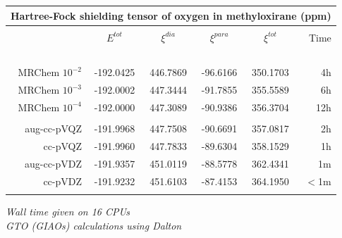 \begin{frame}
\begin{table}
\centering
\begin{tabular}{r|c|cccr}
\multicolumn{6}{c}{\textbf{Hartree-Fock shielding tensor of oxygen in methyloxirane (ppm)}}\\
\hline
\hline
                     &               &               &               &               &               \\
                     & $E^{tot}$     &$\xi^{dia}$    & $\xi^{para}$  &$\xi^{tot}$    &Time           \\
       	             &\hspace{15mm}\ &\hspace{15mm}\ &\hspace{15mm}\ &\hspace{15mm}\ &\hspace{05mm}\ \\
    MRChem $10^{-2}$ & -192.0425     &  446.7869     &  -96.6166     &  350.1703     &    4h         \\
    MRChem $10^{-3}$ & -192.0002     &  447.3444     &  -91.7855     &  355.5589     &    6h         \\
    MRChem $10^{-4}$ & -192.0000     &  447.3089     &  -90.9386     &  356.3704     &   12h         \\
	             &               &               &               &               &               \\
    aug-cc-pVQZ      & -191.9968     &  447.7508     &  -90.6691     &  357.0817     &    2h         \\
	cc-pVQZ      & -191.9960     &  447.7833     &  -89.6304     &  358.1529     &    1h         \\
    aug-cc-pVDZ      & -191.9357     &  451.0119     &  -88.5778     &  362.4341     &    1m         \\
	cc-pVDZ      & -191.9232     &  451.6103     &  -87.4153     &  364.1950     &    $<$1m      \\
	             &               &               &               &               &               \\
\hline
\hline
\end{tabular}
\end{table}

\centering
\scriptsize
\it{Wall time given on 16 CPUs}\\
\it{GTO (GIAOs) calculations using Dalton}

\end{frame}


